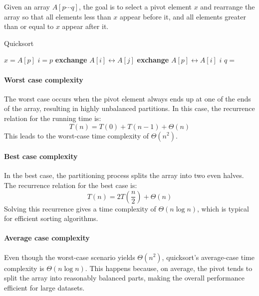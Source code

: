 Given an array $A[p\cdots q]$, the goal is to select a pivot element $x$ and rearrange the array so that all elements less than $x$ appear before it, and all elements greater than or equal to $x$ appear after it.
\begin{algorithm}[H]
    \caption{Quicksort}
    \begin{algorithmic}[1]
            \State $x=A[p]$
            \State $i=p$
                    \State \textbf{exchange }$A[i]\leftrightarrow A[j]$
                \EndIf
            \EndFor
            \State \textbf{exchange }$A[p]\leftrightarrow A[i]$
            \State \Return $i$
        \EndFunction
        \Statex
                \State $q=$
                \State {}
                \State {}
            \EndIf
        \EndProcedure
    \end{algorithmic}
\end{algorithm}  

\paragraph*{Worst case complexity}
The worst case occurs when the pivot element always ends up at one of the ends of the array, resulting in highly unbalanced partitions. 
In this case, the recurrence relation for the running time is:
\[T(n) = T(0) + T(n - 1) + \Theta(n)\]
This leads to the worst-case time complexity of $\Theta(n^2)$.

\paragraph*{Best case complexity}
In the best case, the partitioning process splits the array into two even halves. 
The recurrence relation for the best case is:
\[T(n) = 2T\left(\dfrac{n}{2}\right) + \Theta(n)\]
Solving this recurrence gives a time complexity of $\Theta(n \log n)$, which is typical for efficient sorting algorithms.

\paragraph*{Average case complexity}
Even though the worst-case scenario yields $\Theta(n^2)$, quicksort's average-case time complexity is $\Theta(n \log n)$.
This happens because, on average, the pivot tends to split the array into reasonably balanced parts, making the overall performance efficient for large datasets.

